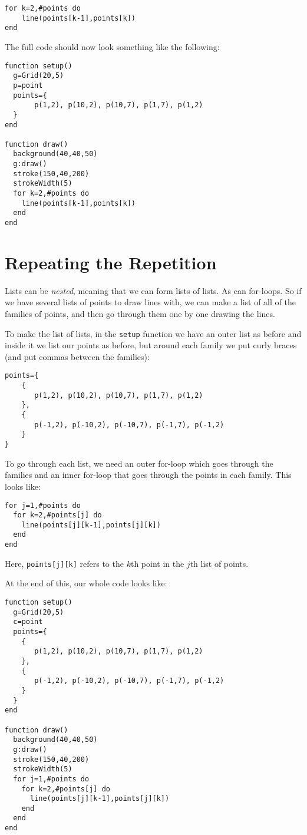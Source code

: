 \documentclass[
  xhtml,%
  use filename%
]{internet}
\begin{document}
\begin{verbatim}
for k=2,#points do
    line(points[k-1],points[k])
end
\end{verbatim}

The full code should now look something like the following:

\begin{verbatim}
function setup()
  g=Grid(20,5)
  p=point
  points={
       p(1,2), p(10,2), p(10,7), p(1,7), p(1,2)
  }
end

function draw()
  background(40,40,50)
  g:draw()
  stroke(150,40,200)
  strokeWidth(5)
  for k=2,#points do
    line(points[k-1],points[k])
  end
end
\end{verbatim}

\section{Repeating the Repetition}

Lists can be \emph{nested}, meaning that we can form lists of lists.
As can for-loops.
So if we have several lists of points to draw lines with, we can make a list of all of the families of points, and then go through them one by one drawing the lines.

To make the list of lists, in the \verb+setup+ function we have an outer list as before and inside it we list our points as before, but around each family we put curly braces (and put commas between the families):

\begin{verbatim}
points={
    {
       p(1,2), p(10,2), p(10,7), p(1,7), p(1,2)
    },
    {
       p(-1,2), p(-10,2), p(-10,7), p(-1,7), p(-1,2)
    }
}
\end{verbatim}

To go through each list, we need an outer for-loop which goes through the families and an inner for-loop that goes through the points in each family.
This looks like:

\begin{verbatim}
for j=1,#points do
  for k=2,#points[j] do
    line(points[j][k-1],points[j][k])
  end
end
\end{verbatim}

Here, \verb+points[j][k]+ refers to the \(k\)th point in the \(j\)th list of points.

At the end of this, our whole code looks like:

\begin{verbatim}
function setup()
  g=Grid(20,5)
  c=point
  points={
    {
       p(1,2), p(10,2), p(10,7), p(1,7), p(1,2)
    },
    {
       p(-1,2), p(-10,2), p(-10,7), p(-1,7), p(-1,2)
    }
  }
end

function draw()
  background(40,40,50)
  g:draw()
  stroke(150,40,200)
  strokeWidth(5)
  for j=1,#points do
    for k=2,#points[j] do
      line(points[j][k-1],points[j][k])
    end
  end
end
\end{verbatim}
\end{document}

